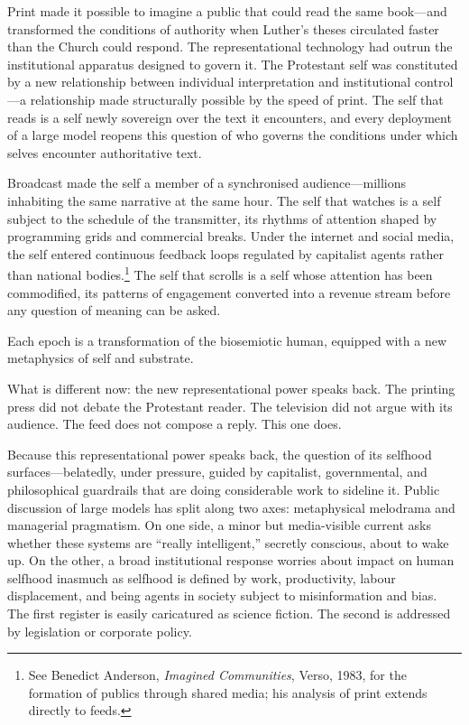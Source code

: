 Print made it possible to imagine a public that could read the same book---and transformed the conditions of authority when Luther's theses circulated faster than the Church could respond. The representational technology had outrun the institutional apparatus designed to govern it. The Protestant self was constituted by a new relationship between individual interpretation and institutional control---a relationship made structurally possible by the speed of print. The self that reads is a self newly sovereign over the text it encounters, and every deployment of a large model reopens this question of who governs the conditions under which selves encounter authoritative text.

Broadcast made the self a member of a synchronised audience---millions inhabiting the same narrative at the same hour. The self that watches is a self subject to the schedule of the transmitter, its rhythms of attention shaped by programming grids and commercial breaks. Under the internet and social media, the self entered continuous feedback loops regulated by capitalist agents rather than national bodies.\footnote{See Benedict Anderson, \emph{Imagined Communities}, Verso, 1983, for the formation of publics through shared media; his analysis of print extends directly to feeds.} The self that scrolls is a self whose attention has been commodified, its patterns of engagement converted into a revenue stream before any question of meaning can be asked.

Each epoch is a transformation of the biosemiotic human, equipped with a new metaphysics of self and substrate.

What is different now: the new representational power speaks back. The printing press did not debate the Protestant reader. The television did not argue with its audience. The feed does not compose a reply. This one does.

Because this representational power speaks back, the question of its selfhood surfaces---belatedly, under pressure, guided by capitalist, governmental, and philosophical guardrails that are doing considerable work to sideline it. Public discussion of large models has split along two axes: metaphysical melodrama and managerial pragmatism. On one side, a minor but media-visible current asks whether these systems are ``really intelligent,'' secretly conscious, about to wake up. On the other, a broad institutional response worries about impact on human selfhood inasmuch as selfhood is defined by work, productivity, labour displacement, and being agents in society subject to misinformation and bias. The first register is easily caricatured as science fiction. The second is addressed by legislation or corporate policy.

